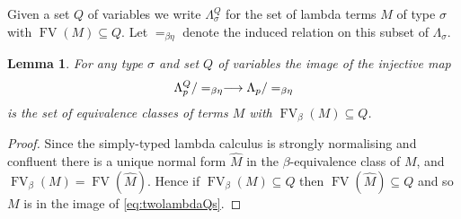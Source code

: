 \documentclass[english,letter paper,12pt,leqno]{article}
\newtheorem{lemma}[theorem]{Lemma}
\theoremstyle{example}
\newtheorem{definition}[theorem]{Definition}
\newtheorem{example}[theorem]{Example}
\newtheorem{remark}[theorem]{Remark}
\numberwithin{equation}{section}
\def\be{\begin{equation}}
\def\ee{\end{equation}}
\def\ldot{\,.\,}
\def\FV{\operatorname{FV}}
\def\typearrow{\rightarrow}
\begin{document}
Given a set $Q$ of variables we write $\Lambda^Q_\sigma$ for the set of lambda terms $M$ of type $\sigma$ with $\operatorname{FV}(M) \subseteq Q$. Let $=_{\beta\eta}$ denote the induced relation on this subset of $\Lambda_\sigma$.

\begin{lemma}\label{lemma:twolambdaQs} For any type $\sigma$ and set $Q$ of variables the image of the injective map
\be\label{eq:twolambdaQs}
\Lambda^Q_p/=_{\beta\eta} \lto \Lambda_p/=_{\beta\eta}
\ee
is the set of equivalence classes of terms $M$ with $\operatorname{FV}_\beta(M) \subseteq Q$.
\end{lemma}
\begin{proof}
Since the simply-typed lambda calculus is strongly normalising \cite[Theorem 3.5.1]{sorensen} and confluent \cite[Theorem 3.6.3]{sorensen} there is a unique normal form $\widehat{M}$ in the $\beta$-equivalence class of $M$, and $\FV_\beta(M) = \FV(\widehat{M})$. Hence if $\operatorname{FV}_\beta(M) \subseteq Q$ then $\operatorname{FV}(\widehat{M}) \subseteq Q$ and so $M$ is in the image of \eqref{eq:twolambdaQs}.
\end{proof}


\end{document}

